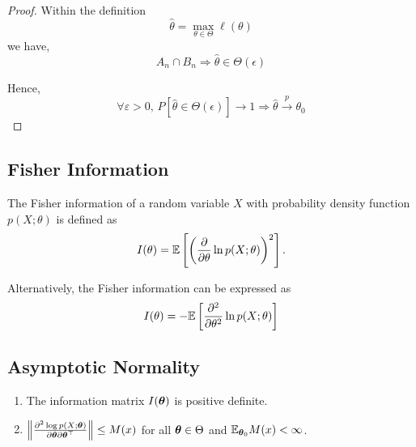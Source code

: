 \begin{proof}
	Within the definition
	\begin{equation*}
		\hat{\theta}=\max_{\theta\in\Theta}\hat{\ell}\left(\theta\right)
	\end{equation*}
	we have,
	\begin{equation*}
		A_{n}\cap B_{n}\Longrightarrow\hat{\theta}\in\Theta(\epsilon)
	\end{equation*}

	Hence,
	\begin{equation*}
		\forall\varepsilon>0,\,P\left[\hat{\theta}\in\Theta(\epsilon)\right]\rightarrow 1\Longrightarrow\hat{\theta}\stackrel{p}{\rightarrow}\theta_{0}
	\end{equation*}
\end{proof}

\subsection{Fisher Information}

\begin{definition}
	The Fisher information of a random variable \(X\) with probability density function \(p(X;\theta)\) is defined as
	\begin{equation}
		I(\theta)=\mathbb{E}\left[\left(\frac{\partial}{\partial\theta}\ln p(X;\theta)\right)^{2}\right].
	\end{equation}
\end{definition}

Alternatively, the Fisher information can be expressed as
\begin{equation}
	I(\theta)=-\mathbb{E}\left[\frac{\partial^{2}}{\partial\theta^{2}}\ln p(X;\theta)\right]
\end{equation}

\subsection{Asymptotic Normality}

\begin{enumerate}[label = (C\arabic*), resume]
	\item The information matrix \(I(\boldsymbol{\theta})\) is positive definite.
	\item \(\left\|\frac{\partial^{2}\log p(X;\boldsymbol{\theta})}{\partial\boldsymbol{\theta}\partial\boldsymbol{\theta}^{\top}}\right\|\leq M(x)\) for all \(\boldsymbol{\theta}\in\Theta\) and \(\mathbb{E}_{\boldsymbol{\theta}_{0}}M(x)<\infty\).
\end{enumerate}

